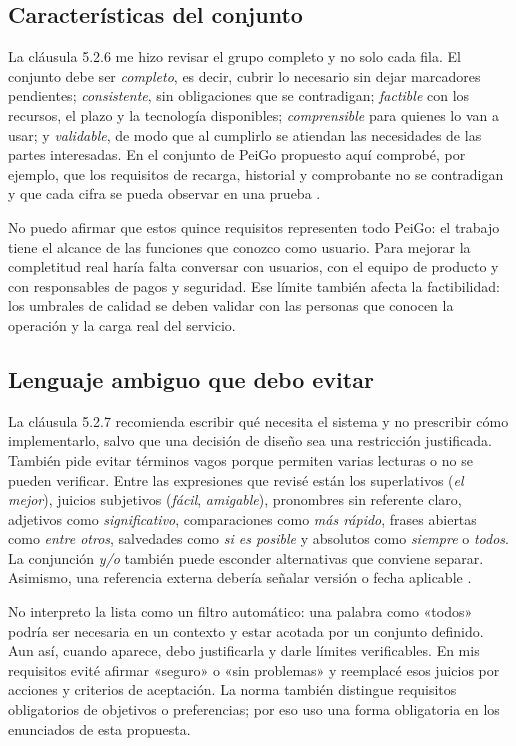 \documentclass[10pt,letterpaper]{article}
\begin{document}
\subsection{Características del conjunto}
La cláusula 5.2.6 me hizo revisar el grupo completo y no solo cada fila. El conjunto debe ser \textit{completo}, es decir, cubrir lo necesario sin dejar marcadores pendientes; \textit{consistente}, sin obligaciones que se contradigan; \textit{factible} con los recursos, el plazo y la tecnología disponibles; \textit{comprensible} para quienes lo van a usar; y \textit{validable}, de modo que al cumplirlo se atiendan las necesidades de las partes interesadas. En el conjunto de PeiGo propuesto aquí comprobé, por ejemplo, que los requisitos de recarga, historial y comprobante no se contradigan y que cada cifra se pueda observar en una prueba \cite[cl. 5.2.6]{iso29148}.

No puedo afirmar que estos quince requisitos representen todo PeiGo: el trabajo tiene el alcance de las funciones que conozco como usuario. Para mejorar la completitud real haría falta conversar con usuarios, con el equipo de producto y con responsables de pagos y seguridad. Ese límite también afecta la factibilidad: los umbrales de calidad se deben validar con las personas que conocen la operación y la carga real del servicio.

\subsection{Lenguaje ambiguo que debo evitar}
La cláusula 5.2.7 recomienda escribir qué necesita el sistema y no prescribir cómo implementarlo, salvo que una decisión de diseño sea una restricción justificada. También pide evitar términos vagos porque permiten varias lecturas o no se pueden verificar. Entre las expresiones que revisé están los superlativos (\textit{el mejor}), juicios subjetivos (\textit{fácil}, \textit{amigable}), pronombres sin referente claro, adjetivos como \textit{significativo}, comparaciones como \textit{más rápido}, frases abiertas como \textit{entre otros}, salvedades como \textit{si es posible} y absolutos como \textit{siempre} o \textit{todos}. La conjunción \textit{y/o} también puede esconder alternativas que conviene separar. Asimismo, una referencia externa debería señalar versión o fecha aplicable \cite[cl. 5.2.7]{iso29148}.

No interpreto la lista como un filtro automático: una palabra como «todos» podría ser necesaria en un contexto y estar acotada por un conjunto definido. Aun así, cuando aparece, debo justificarla y darle límites verificables. En mis requisitos evité afirmar «seguro» o «sin problemas» y reemplacé esos juicios por acciones y criterios de aceptación. La norma también distingue requisitos obligatorios de objetivos o preferencias; por eso uso una forma obligatoria en los enunciados de esta propuesta.
\end{document}

